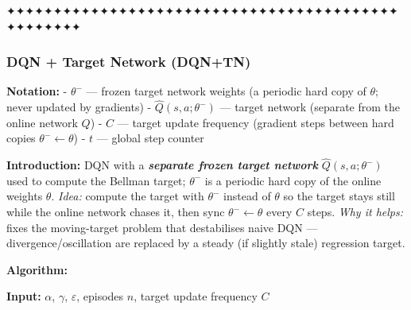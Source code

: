 \documentclass[11pt]{article}
\begin{document}
    ✦✦✦✦✦✦✦✦✦✦✦✦✦✦✦✦✦✦✦✦✦✦✦✦✦✦✦✦✦✦✦✦✦✦✦✦✦✦✦✦✦✦✦✦✦✦✦✦✦✦

    \clearpage

\label{dqn-target-network}

    \subsubsection{DQN + Target Network
(DQN+TN)}\label{dqn-target-network-dqntn}

    \textbf{Notation:} - \(\theta^-\) --- frozen target network weights (a
periodic hard copy of \(\theta\); never updated by gradients) -
\(\hat{Q}(s,a;\theta^-)\) --- target network (separate from the online
network \(Q\)) - \(C\) --- target update frequency (gradient steps
between hard copies \(\theta^- \leftarrow \theta\)) - \(t\) --- global
step counter

    \label{intro-3-2}

    \textbf{Introduction:} DQN with a \textbf{\emph{separate frozen target
network}} \(\hat{Q}(s,a;\theta^-)\) used to compute the Bellman target;
\(\theta^-\) is a periodic hard copy of the online weights \(\theta\).
\emph{Idea:} compute the target with \(\theta^-\) instead of \(\theta\)
so the target stays still while the online network chases it, then sync
\(\theta^- \leftarrow \theta\) every \(C\) steps. \emph{Why it helps:}
fixes the moving-target problem that destabilises naive DQN ---
divergence/oscillation are replaced by a steady (if slightly stale)
regression target.

    \textbf{Algorithm:}

\textbf{Input:} \(\alpha\), \(\gamma\), \(\varepsilon\), episodes \(n\),
target update frequency \(C\)
\end{document}
